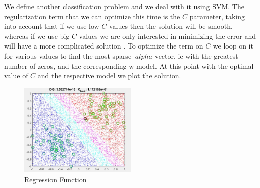 
	We define another classification problem and we deal with it using SVM.
	The regularization term that we can optimize this time is the $C$ parameter, taking into account that if we use low $C$ values then the solution will be smooth, whereas if we use big $C$ values we are only interested in minimizing the error and will have a more complicated solution .
	To optimize the term on $C$ we loop on it for various values to find the most sparse $ \ alpha $ vector, ie with the greatest number of zeros, and the corresponding w model. At this point with the optimal value of $C$ and the respective model we plot the solution.
	
	\begin{figure}[h]
		\centering
		\includegraphics[width=0.5\textwidth]{i2.png}
		\caption{Regression Function}
		\label{fig:regression function}
	\end{figure}
